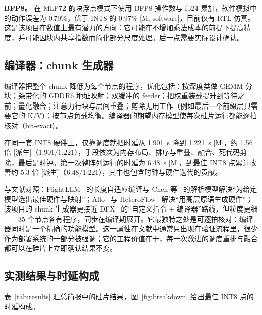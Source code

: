 \documentclass[a4paper,10.5pt]{ctexart}
\newcommand{\tM}{\textsf{[M]}}              %
\newcommand{\tMsw}{\textsf{[M, software]}}  %
\newcommand{\tD}{\textsf{[派生]}}           %
\begin{document}
\textbf{BFP8。} 在 MLP72 的块浮点模式下使用 BFP8 操作数与 fp24 累加，软件模拟中的动作误差为 0.70\%，优于 INT8 的 0.97\% \tMsw，目前仅有 RTL 仿真。这是该项目在数值上最有潜力的方向：它可能在不增加乘法成本的前提下提高精度，并可能因块内共享指数而简化部分尺度处理。后一点需要实际设计确认。

\subsection{编译器：chunk 生成器}

编译器把整个 chunk 降低为每个节点的程序，优化包括：按深度类做 GEMM 分块；条带化的 GDDR6 地址映射；双缓冲的 feeder；把权重装载提升到等待之前；量化融合；注意力行块与层间重叠；剪除无用工作（例如最后一个前缀层只需要它的 K/V）；按节点负载均衡。编译器的期望内存模型使每次硅片运行都能逐拍核对（bit-exact）。

在同一套 INT8 硬件上，仅靠调度就把时延从 1.901~s 降到 1.221~s \tM，约 1.56 倍 \tD（$1.901/1.221$），手段依次为内存布局、排序与重叠、融合、死代码剪除，最后是时钟。第一次整阵列运行的时延为 6.48~s \tM，到最佳 INT8 点累计改善约 5.3 倍 \tD（$6.48/1.221$），其中也包含时钟与硬件迭代的贡献。

与文献对照：FlightLLM~\cite{flightllm} 的长度自适应编译与 Chen 等~\cite{chen2024trets} 的解析模型解决“为给定模型选出最佳硬件与映射”；Allo~\cite{allo} 与 HeteroFlow~\cite{heteroflow} 解决“用高层原语生成硬件”；该项目的 chunk 生成器更接近 DFX~\cite{dfx} 的“自定义指令 + 编译器”路线，但粒度更细——35 个节点各有程序，同步在编译期展开。它最独特之处是可逐拍核对：编译器同时是一个精确的功能模型。这一属性在文献中通常只出现在验证流程里，很少作为部署系统的一部分被强调；它的工程价值在于，每一次激进的调度重排与融合都可以在硅片上立即确认结果不变。

\subsection{实测结果与时延构成}

表~\ref{tab:results} 汇总简报中的硅片结果，图~\ref{fig:breakdown} 给出最佳 INT8 点的时延构成。
\end{document}
